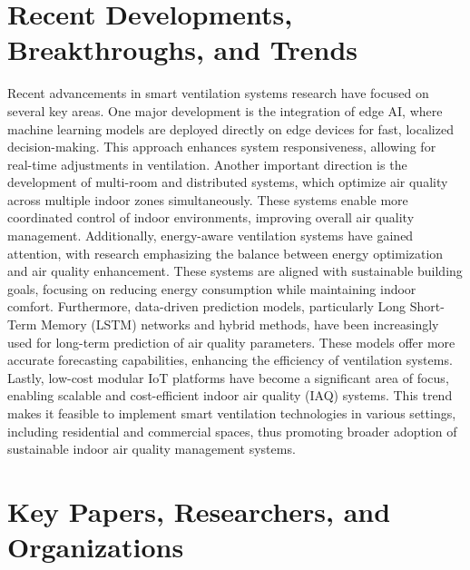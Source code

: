 \section{Recent Developments, Breakthroughs, and Trends}  
Recent advancements in smart ventilation systems research have focused on several key areas. One major development is the integration of edge AI, where machine learning models are deployed directly on edge devices for fast, localized decision-making. This approach enhances system responsiveness, allowing for real-time adjustments in ventilation. Another important direction is the development of multi-room and distributed systems, which optimize air quality across multiple indoor zones simultaneously. These systems enable more coordinated control of indoor environments, improving overall air quality management. Additionally, energy-aware ventilation systems have gained attention, with research emphasizing the balance between energy optimization and air quality enhancement. These systems are aligned with sustainable building goals, focusing on reducing energy consumption while maintaining indoor comfort. Furthermore, data-driven prediction models, particularly Long Short-Term Memory (LSTM) networks and hybrid methods, have been increasingly used for long-term prediction of air quality parameters. These models offer more accurate forecasting capabilities, enhancing the efficiency of ventilation systems. Lastly, low-cost modular IoT platforms have become a significant area of focus, enabling scalable and cost-efficient indoor air quality (IAQ) systems. This trend makes it feasible to implement smart ventilation technologies in various settings, including residential and commercial spaces, thus promoting broader adoption of sustainable indoor air quality management systems.

\section{Key Papers, Researchers, and Organizations}  

